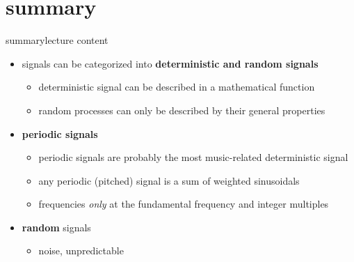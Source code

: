     \section{summary}
        \begin{frame}{summary}{lecture content}
            \begin{itemize}
                \item   signals can be categorized into \textbf{deterministic and random signals}
                    \begin{itemize}
                        \item   deterministic signal can be described in a mathematical function
                        \item   random processes can only be described by their general properties
                    \end{itemize}
                \smallskip
                \item      \textbf{periodic signals}
                    \begin{itemize}
                        \item   periodic signals are probably the most music-related deterministic signal
                        \item   any periodic (pitched) signal is a sum of weighted sinusoidals
                        \item   frequencies \textit{only} at the fundamental frequency and integer multiples
                    \end{itemize}
                \smallskip
                \item   \textbf{random} signals
                    \begin{itemize}
                        \item   noise, unpredictable

\end{itemize}
\end{itemize}
\end{frame}
